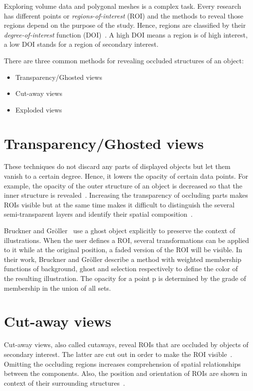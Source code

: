 
Exploring volume data and polygonal meshes is a complex task. Every research has different points or \emph{regions-of-interest} (ROI) and the methods to reveal those regions depend on the purpose of the study. Hence, regions are classified by their \emph{degree-of-interest} function (DOI)~\cite{proc:intelligentCutaway}. A high DOI means a region is of high interest, a low DOI stands for a region of secondary interest.

There are three common methods for revealing occluded structures of an object:
\begin{itemize}
	\item Transparency/Ghosted views
	\item Cut-away views
	\item Exploded views
\end{itemize}

\section{Transparency/Ghosted views}
These techniques do not discard any parts of displayed objects but let them vanish to a certain degree. Hence, it lowers the opacity of certain data points. For example, the opacity of the outer structure of an object is decreased so that the inner structure is revealed~\cite{jour:correa}. Increasing the transparency of occluding parts makes ROIs visible but at the same time makes it difficult to distinguish the several semi-transparent layers and identify their spatial composition~\cite{jour:interactiveCutaway}.

Bruckner and Gr{\"o}ller~\cite{proc:volumeshop} use a ghost object explicitly to preserve the context of illustrations. When the user defines a ROI, several transformations can be applied to it while at the original position, a faded version of the ROI will be visible. In their work, Bruckner and Gr{\"o}ller describe a method with weighted membership functions of background, ghost and selection respectively to define the color of the resulting illustration. The opacity for a point p is determined by the grade of membership in the union of all sets.

\section{Cut-away views}
Cut-away views, also called cutaways, reveal ROIs that are occluded by objects of secondary interest. The latter are cut out in order to make the ROI visible~\cite{proc:volumeshop}\cite{jour:adaptiveCutaways}\cite{jour:correa}\cite{incoll:cutawayIllustration}. Omitting the occluding regions increases comprehension of spatial relationships between the components. Also, the position and orientation of ROIs are shown in context of their surrounding structures~\cite{jour:interactiveCutaway}.

